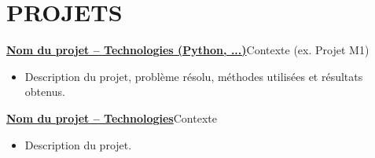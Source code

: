 \section{PROJETS}
\resumeSubHeadingListStart

\resumeProjectHeading
  {\textbf{\href{https://github.com/username/projet}{Nom du projet -- Technologies (Python, ...)}}}{Contexte (ex. Projet M1)}
  \begin{itemize}[leftmargin=0.12in, label={}, itemsep=0pt]
    \item \small Description du projet, problème résolu, méthodes utilisées et résultats obtenus.
  \end{itemize}

\vspace{-3pt}

\resumeProjectHeading
  {\textbf{\href{https://github.com/username/projet}{Nom du projet -- Technologies}}}{Contexte}
  \begin{itemize}[leftmargin=0.12in, label={}, itemsep=0pt]
    \item \small Description du projet.
  \end{itemize}

\resumeSubHeadingListEnd
